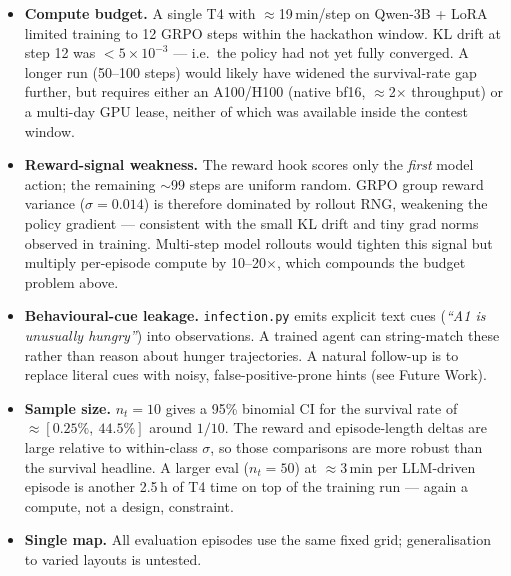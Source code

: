 \documentclass[11pt,a4paper]{article}
\begin{document}
\begin{itemize}[leftmargin=*]
  \item \textbf{Compute budget.} A single T4 with $\approx$19\,min/step on
        Qwen-3B + LoRA limited training to 12 GRPO steps within the
        hackathon window. KL drift at step 12 was $<5\!\times\!10^{-3}$ ---
        i.e.\ the policy had not yet fully converged. A longer run
        (50--100 steps) would likely have widened the survival-rate gap
        further, but requires either an A100/H100 (native bf16, $\approx$2$\times$
        throughput) or a multi-day GPU lease, neither of which was available
        inside the contest window.
  \item \textbf{Reward-signal weakness.} The reward hook scores only the
        \emph{first} model action; the remaining $\sim$99 steps are uniform
        random. GRPO group reward variance ($\sigma{=}0.014$) is therefore
        dominated by rollout RNG, weakening the policy gradient --- consistent
        with the small KL drift and tiny grad norms observed in training.
        Multi-step model rollouts would tighten this signal but multiply
        per-episode compute by 10--20$\times$, which compounds the budget
        problem above.
  \item \textbf{Behavioural-cue leakage.} \texttt{infection.py} emits explicit
        text cues (\textit{``A1 is unusually hungry''}) into observations. A
        trained agent can string-match these rather than reason about hunger
        trajectories. A natural follow-up is to replace literal cues with
        noisy, false-positive-prone hints (see Future Work).
  \item \textbf{Sample size.} $n_t{=}10$ gives a 95\% binomial CI for the
        survival rate of $\approx[0.25\%,\ 44.5\%]$ around $1/10$. The reward
        and episode-length deltas are large relative to within-class
        $\sigma$, so those comparisons are more robust than the survival
        headline. A larger eval ($n_t{=}50$) at $\approx$3\,min per
        LLM-driven episode is another 2.5\,h of T4 time on top of the
        training run --- again a compute, not a design, constraint.
  \item \textbf{Single map.} All evaluation episodes use the same fixed grid;
        generalisation to varied layouts is untested.
\end{itemize}

\end{document}
